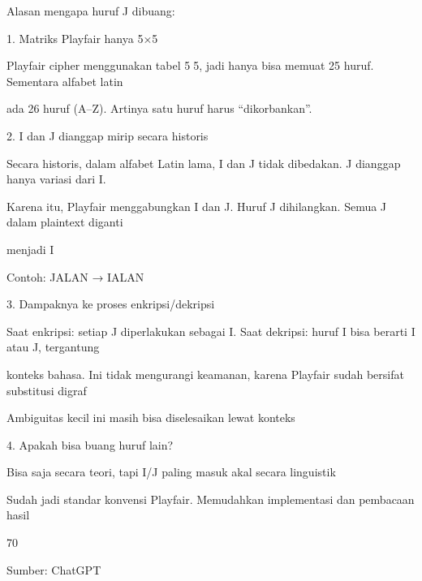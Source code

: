 \documentclass{article}
\begin{document}

Alasan mengapa huruf  J dibuang:

1. Matriks Playfair hanya 5×5

Playfair cipher menggunakan tabel 55, jadi hanya bisa memuat 25 huruf.  Sementara alfabet latin 

ada 26 huruf (A–Z). Artinya satu huruf harus “dikorbankan”.

2. I dan J dianggap mirip secara historis

Secara historis, dalam alfabet Latin lama, I dan J tidak dibedakan.  J dianggap hanya variasi dari I.  

Karena itu, Playfair menggabungkan I dan J. Huruf J dihilangkan. Semua J dalam plaintext diganti 

menjadi I

Contoh:  JALAN → IALAN

3. Dampaknya ke proses enkripsi/dekripsi

Saat enkripsi: setiap J diperlakukan sebagai I. Saat dekripsi: huruf I bisa berarti I atau J, tergantung 

konteks bahasa. Ini tidak mengurangi keamanan, karena Playfair sudah bersifat substitusi digraf

Ambiguitas kecil ini masih bisa diselesaikan lewat konteks

4. Apakah bisa buang huruf lain?

Bisa saja secara teori, tapi  I/J paling masuk akal secara linguistik

Sudah jadi standar konvensi Playfair. Memudahkan implementasi dan pembacaan hasil

70

Sumber: ChatGPT
\end{document}
